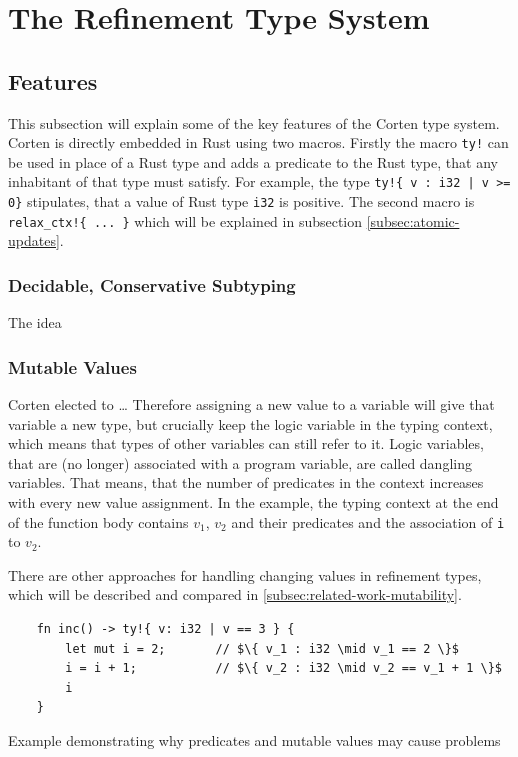 \documentclass{book}
\newcommand{\code}[1]{\texttt{#1}}
\theoremstyle{definition}
\begin{document}
\chapter{The Refinement Type System}


\section{Features}

This subsection will explain some of the key features of the Corten type system.
Corten is directly embedded in Rust using two macros. Firstly the macro \code{ty!} can be used in place of a Rust type and adds a predicate to the Rust type, that any inhabitant of that type must satisfy. For example, the type \code{ty!\{ v : i32 | v >= 0\}} stipulates, that a value of Rust type \code{i32} is positive. The second macro is \code{relax\_ctx!\{ ... \}} which will be explained in subsection \ref{subsec:atomic-updates}.

\subsection{Decidable, Conservative Subtyping}

The idea 

\subsection{Mutable Values}

Corten elected to  \dots
Therefore assigning a new value to a variable will give that variable a new type, but \- crucially \- keep the logic variable in the typing context, which means that types of other variables can still refer to it. Logic variables, that are (no longer) associated with a program variable, are called dangling variables.
That means, that the number of predicates in the context increases with every new value assignment.
In the example, the typing context at the end of the function body contains $v_1$, $v_2$ and their predicates and the association of \code{i} to $v_2$.

There are other approaches for handling changing values in refinement types, which will be described and compared in \ref{subsec:related-work-mutability}.


\begin{listing}[h]
  \begin{verbatim}
    fn inc() -> ty!{ v: i32 | v == 3 } {
        let mut i = 2;       // $\{ v_1 : i32 \mid v_1 == 2 \}$
        i = i + 1;           // $\{ v_2 : i32 \mid v_2 == v_1 + 1 \}$
        i
    }
  \end{verbatim}
  \caption{Example demonstrating why predicates and mutable values may cause problems}
  \label{lst:mutable-values}
\end{listing}
\end{document}
